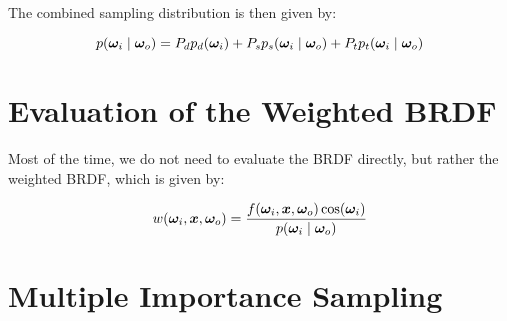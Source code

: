 The combined sampling distribution is then given by:

\begin{equation}
    p(\bm{\omega}_i \mid \bm{\omega}_o) = P_d p_d(\bm{\omega}_i) + P_s p_s(\bm{\omega}_i \mid \bm{\omega}_o) + P_t p_t(\bm{\omega}_i \mid \bm{\omega}_o)
\end{equation}

\section{Evaluation of the Weighted BRDF}

Most of the time, we do not need to evaluate the BRDF directly, but rather the weighted BRDF, which is given by:

\begin{equation}
    w(\bm{\omega}_i, \bm{x}, \bm{\omega}_o) = \frac{f(\bm{\omega}_i, \bm{x}, \bm{\omega}_o) \cos(\bm{\omega}_i)}{p(\bm{\omega}_i \mid \bm{\omega}_o)}
\end{equation}

\section{Multiple Importance Sampling}
\label{sec:mis}
